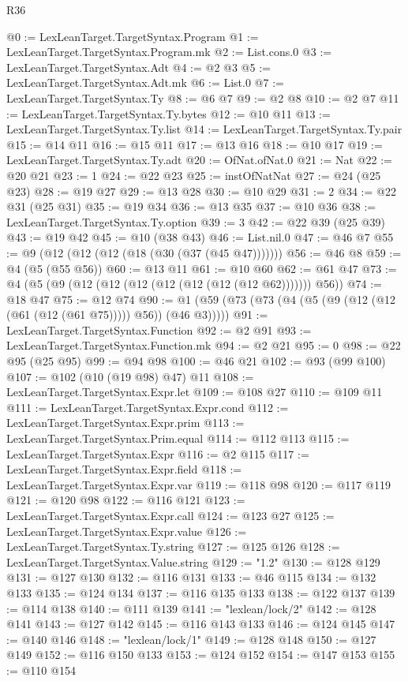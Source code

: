 \begin{lexlean}{R36}
\begin{coremodule}
@0 := LexLeanTarget.TargetSyntax.Program
@1 := LexLeanTarget.TargetSyntax.Program.mk
@2 := List.cons.{0}
@3 := LexLeanTarget.TargetSyntax.Adt
@4 := @2 @3
@5 := LexLeanTarget.TargetSyntax.Adt.mk
@6 := List.{0}
@7 := LexLeanTarget.TargetSyntax.Ty
@8 := @6 @7
@9 := @2 @8
@10 := @2 @7
@11 := LexLeanTarget.TargetSyntax.Ty.bytes
@12 := @10 @11
@13 := LexLeanTarget.TargetSyntax.Ty.list
@14 := LexLeanTarget.TargetSyntax.Ty.pair
@15 := @14 @11
@16 := @15 @11
@17 := @13 @16
@18 := @10 @17
@19 := LexLeanTarget.TargetSyntax.Ty.adt
@20 := OfNat.ofNat.{0}
@21 := Nat
@22 := @20 @21
@23 := 1
@24 := @22 @23
@25 := instOfNatNat
@27 := @24 (@25 @23)
@28 := @19 @27
@29 := @13 @28
@30 := @10 @29
@31 := 2
@34 := @22 @31 (@25 @31)
@35 := @19 @34
@36 := @13 @35
@37 := @10 @36
@38 := LexLeanTarget.TargetSyntax.Ty.option
@39 := 3
@42 := @22 @39 (@25 @39)
@43 := @19 @42
@45 := @10 (@38 @43)
@46 := List.nil.{0}
@47 := @46 @7
@55 := @9 (@12 (@12 (@12 (@18 (@30 (@37 (@45 @47)))))))
@56 := @46 @8
@59 := @4 (@5 (@55 @56))
@60 := @13 @11
@61 := @10 @60
@62 := @61 @47
@73 := @4 (@5 (@9 (@12 (@12 (@12 (@12 (@12 (@12 (@12 @62))))))) @56))
@74 := @18 @47
@75 := @12 @74
@90 := @1 (@59 (@73 (@73 (@4 (@5 (@9 (@12 (@12 (@61 (@12 (@61 @75))))) @56)) (@46 @3)))))
@91 := LexLeanTarget.TargetSyntax.Function
@92 := @2 @91
@93 := LexLeanTarget.TargetSyntax.Function.mk
@94 := @2 @21
@95 := 0
@98 := @22 @95 (@25 @95)
@99 := @94 @98
@100 := @46 @21
@102 := @93 (@99 @100)
@107 := @102 (@10 (@19 @98) @47) @11
@108 := LexLeanTarget.TargetSyntax.Expr.let
@109 := @108 @27
@110 := @109 @11
@111 := LexLeanTarget.TargetSyntax.Expr.cond
@112 := LexLeanTarget.TargetSyntax.Expr.prim
@113 := LexLeanTarget.TargetSyntax.Prim.equal
@114 := @112 @113
@115 := LexLeanTarget.TargetSyntax.Expr
@116 := @2 @115
@117 := LexLeanTarget.TargetSyntax.Expr.field
@118 := LexLeanTarget.TargetSyntax.Expr.var
@119 := @118 @98
@120 := @117 @119
@121 := @120 @98
@122 := @116 @121
@123 := LexLeanTarget.TargetSyntax.Expr.call
@124 := @123 @27
@125 := LexLeanTarget.TargetSyntax.Expr.value
@126 := LexLeanTarget.TargetSyntax.Ty.string
@127 := @125 @126
@128 := LexLeanTarget.TargetSyntax.Value.string
@129 := "1.2"
@130 := @128 @129
@131 := @127 @130
@132 := @116 @131
@133 := @46 @115
@134 := @132 @133
@135 := @124 @134
@137 := @116 @135 @133
@138 := @122 @137
@139 := @114 @138
@140 := @111 @139
@141 := "lexlean/lock/2"
@142 := @128 @141
@143 := @127 @142
@145 := @116 @143 @133
@146 := @124 @145
@147 := @140 @146
@148 := "lexlean/lock/1"
@149 := @128 @148
@150 := @127 @149
@152 := @116 @150 @133
@153 := @124 @152
@154 := @147 @153
@155 := @110 @154

\end{coremodule}
\end{lexlean}
